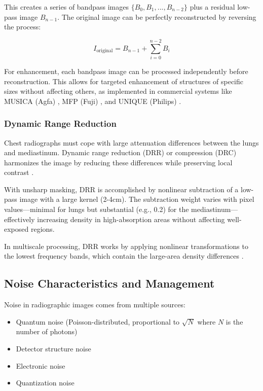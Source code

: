 \documentclass[nomenclature, english, bibtex]{kththesis}
\numberwithin{listing}{chapter}
\begin{document}
This creates a series of bandpass images $\{B_0, B_1, ..., B_{n-2}\}$ plus a residual low-pass image $B_{n-1}$. The original image can be perfectly reconstructed by reversing the process:

\begin{equation}
I_{\text{original}} = B_{n-1} + \sum_{i=0}^{n-2} B_i
\end{equation}

For enhancement, each bandpass image can be processed independently before reconstruction. This allows for targeted enhancement of structures of specific sizes without affecting others, as implemented in commercial systems like MUSICA (Agfa) \cite{vuylsteke1994multiscale}, MFP (Fuji) \cite{ogoda1997unsharp}, and UNIQUE (Philips) \cite{stahl2000digital}.

\subsubsection{Dynamic Range Reduction}
Chest radiographs must cope with large attenuation differences between the lungs and mediastinum. Dynamic range reduction (DRR) or compression (DRC) harmonizes the image by reducing these differences while preserving local contrast \cite{cowen1988computer,prokop2003principles}.

With unsharp masking, DRR is accomplished by nonlinear subtraction of a low-pass image with a large kernel (2-4cm). The subtraction weight varies with pixel values—minimal for lungs but substantial (e.g., 0.2) for the mediastinum—effectively increasing density in high-absorption areas without affecting well-exposed regions.

In multiscale processing, DRR works by applying nonlinear transformations to the lowest frequency bands, which contain the large-area density differences \cite{stahl2000digital}.

\subsection{Noise Characteristics and Management}
Noise in radiographic images comes from multiple sources:
\begin{itemize}
    \item Quantum noise (Poisson-distributed, proportional to $\sqrt{N}$ where $N$ is the number of photons)
    \item Detector structure noise
    \item Electronic noise
    \item Quantization noise
\end{itemize}
\end{document}
